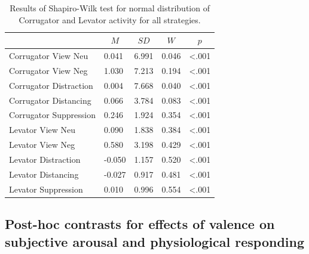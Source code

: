 \documentclass[
  man,floatsintext]{apa6}
\begin{document}
\begin{table}[H]

\begin{center}
\begin{threeparttable}

\caption{\label{tab:TabNCEMG}Results of Shapiro-Wilk test for normal distribution of Corrugator and Levator activity for all strategies.}

\begin{tabular}{lllll}
\toprule
 & \multicolumn{1}{c}{$M$} & \multicolumn{1}{c}{$SD$} & \multicolumn{1}{c}{$W$} & \multicolumn{1}{c}{$p$}\\
\midrule
Corrugator View Neu & 0.041 & 6.991 & 0.046 & <.001\\
Corrugator View Neg & 1.030 & 7.213 & 0.194 & <.001\\
Corrugator Distraction & 0.004 & 7.668 & 0.040 & <.001\\
Corrugator Distancing & 0.066 & 3.784 & 0.083 & <.001\\
Corrugator Suppression & 0.246 & 1.924 & 0.354 & <.001\\
Levator View Neu & 0.090 & 1.838 & 0.384 & <.001\\
Levator View Neg & 0.580 & 3.198 & 0.429 & <.001\\
Levator Distraction & -0.050 & 1.157 & 0.520 & <.001\\
Levator Distancing & -0.027 & 0.917 & 0.481 & <.001\\
Levator Suppression & 0.010 & 0.996 & 0.554 & <.001\\
\bottomrule
\end{tabular}

\end{threeparttable}
\end{center}

\end{table}

\newpage

\hypertarget{SupplementEffectValence}{%
\subsection{Post-hoc contrasts for effects of valence on subjective arousal and physiological responding}\label{SupplementEffectValence}}
\end{document}
